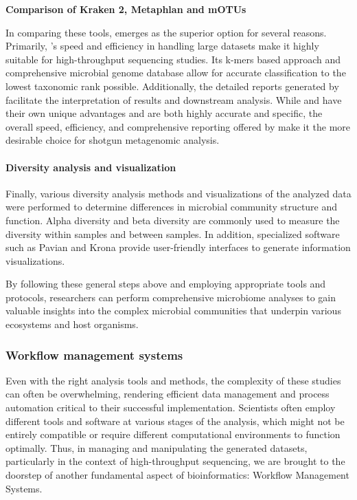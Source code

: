             \textbf{Comparison of Kraken 2, Metaphlan and mOTUs}

            In comparing these tools,  emerges as the superior option for several reasons. Primarily, 's speed and efficiency in handling large datasets make it highly suitable for high-throughput sequencing studies. Its k-mers based approach and comprehensive microbial genome database allow for accurate classification to the lowest taxonomic rank possible. Additionally, the detailed reports generated by  facilitate the interpretation of results and downstream analysis. While  and  have their own unique advantages and are both highly accurate and specific, the overall speed, efficiency, and comprehensive reporting offered by  make it the more desirable choice for shotgun metagenomic analysis.
            

        
        \paragraph*{Diversity analysis and visualization}
        Finally, various diversity analysis methods and visualizations of the analyzed data were performed to determine differences in microbial community structure and function. Alpha diversity and beta diversity are commonly used to measure the diversity within samples and between samples. In addition, specialized software such as Pavian \cite{breitwieser2020pavian} and Krona \cite{ondov2011interactive} provide user-friendly interfaces to generate information visualizations.

    
        By following these general steps above and employing appropriate tools and protocols, researchers can perform comprehensive microbiome analyses to gain valuable insights into the complex microbial communities that underpin various ecosystems and host organisms.


        \subsubsection{Workflow management systems}
            Even with the right analysis tools and methods, the complexity of these studies can often be overwhelming, rendering efficient data management and process automation critical to their successful implementation. Scientists often employ different tools and software at various stages of the analysis, which might not be entirely compatible or require different computational environments to function optimally. Thus, in managing and manipulating the generated datasets, particularly in the context of high-throughput sequencing, we are brought to the doorstep of another fundamental aspect of bioinformatics: Workflow Management Systems.
        

